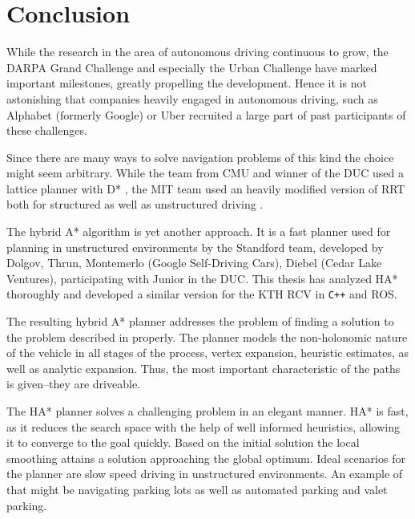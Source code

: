 \chapter{Conclusion}
While the research in the area of autonomous driving continuous to grow, the DARPA Grand Challenge and especially the Urban Challenge have marked important milestones, greatly propelling the development. Hence it is not astonishing that companies heavily engaged in autonomous driving, such as Alphabet (formerly Google) or Uber recruited a large part of past participants of these challenges.

Since there are many ways to solve navigation problems of this kind the choice might seem arbitrary. While the team from CMU and winner of the DUC used a lattice planner with D* \cite{Ferguson.2008b,Likhachev.2005}, the MIT team used an heavily modified version of RRT both for structured as well as unstructured driving \cite{Kuwata.2008}.

The hybrid A* algorithm is yet another approach. It is a fast planner used for planning in unstructured environments by the Standford team, developed by Dolgov, Thrun, Montemerlo (Google Self-Driving Cars), Diebel (Cedar Lake Ventures), participating with Junior in the DUC.
This thesis has analyzed HA* thoroughly and developed a similar version for the KTH RCV in \texttt{C++} and ROS.

The resulting hybrid A* planner addresses the problem of finding a solution to the problem described in  properly. The planner models the non-holonomic nature of the vehicle in all stages of the process, vertex expansion, heuristic estimates, as well as analytic expansion. Thus, the most important characteristic of the paths is given--they are driveable. 

The HA* planner solves a challenging problem in an elegant manner. HA* is fast, as it reduces the search space with the help of well informed heuristics, allowing it to converge to the goal quickly. Based on the initial solution the local smoothing attains a solution approaching the global optimum. Ideal scenarios for the planner are slow speed driving in unstructured environments. An example of that might be navigating parking lots as well as automated parking and valet parking.